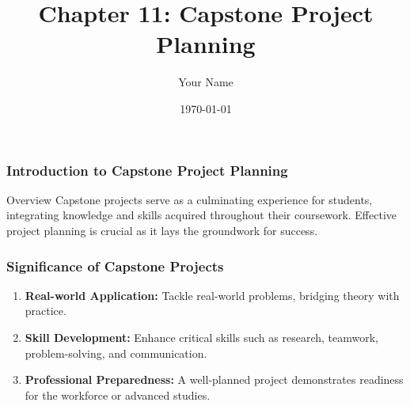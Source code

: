 \documentclass{beamer}
\title{Chapter 11: Capstone Project Planning}
\author{Your Name}
\institute{Your Institution}
\date{\today}
\begin{document}
\frame{\titlepage}

\begin{frame}[fragile]
    \frametitle{Introduction to Capstone Project Planning}
    \begin{block}{Overview}
        Capstone projects serve as a culminating experience for students, integrating knowledge and skills acquired throughout their coursework. Effective project planning is crucial as it lays the groundwork for success.
    \end{block}
\end{frame}

\begin{frame}[fragile]
    \frametitle{Significance of Capstone Projects}
    \begin{enumerate}
        \item \textbf{Real-world Application:} Tackle real-world problems, bridging theory with practice.
        \item \textbf{Skill Development:} Enhance critical skills such as research, teamwork, problem-solving, and communication.
        \item \textbf{Professional Preparedness:} A well-planned project demonstrates readiness for the workforce or advanced studies.
    \end{enumerate}
\end{frame}
\end{document}
